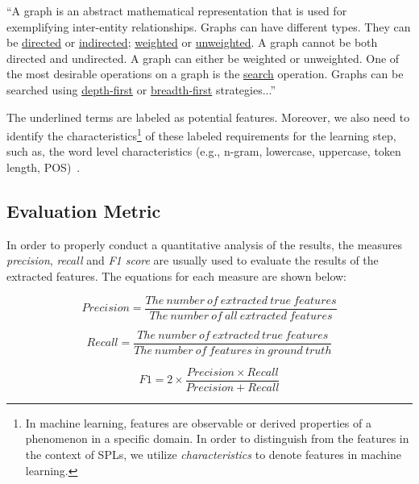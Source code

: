 \documentclass[graybox]{svmult}
\begin{document}
\vspace{2mm}
\begin{mdframed}[style=mystyle]
``A graph is an abstract mathematical representation that is used for exemplifying inter-entity relationships. Graphs can have different types. They can be \uline{directed} or \uline{indirected}; \uline{weighted} or \uline{unweighted}. A graph cannot be both directed and undirected. A graph can either be weighted or unweighted. One of the most desirable operations on a graph is the \uline{search} operation. Graphs can be searched using \uline{depth-first} or \uline{breadth-first} strategies...''
\end{mdframed}
\vspace{4mm}

The underlined terms are labeled as potential features. Moreover, we also need to identify the characteristics\footnote{In machine learning, features are observable or derived properties of a phenomenon in a specific domain. In order to distinguish from the features in the context of SPLs, we utilize \textit{characteristics} to denote features in machine learning.} of these labeled requirements for the learning step, such as, the word level characteristics (e.g., n-gram, lowercase, uppercase, token length, POS)~\cite{NadeauS07}.

\subsection{Evaluation Metric}

In order to properly conduct a quantitative analysis of the results, the measures \textit{precision}, \textit{recall} and \textit{F1 score} are usually used to evaluate the results of the extracted features. The equations for each measure are shown below:

\begin{equation}
Precision = \frac{The\ number\ of\ extracted\ true\ features}{ The\ number\ of\ all\ extracted\ features}
\end{equation}

\begin{equation}
Recall = \frac{The\ number\ of\ extracted\ true\ features}{ The\ number\ of\ features\ in\ ground\ truth}
\end{equation}

\begin{equation}
F1 = 2 \times \frac{Precision \times Recall}{Precision + Recall}
\end{equation}
\end{document}
